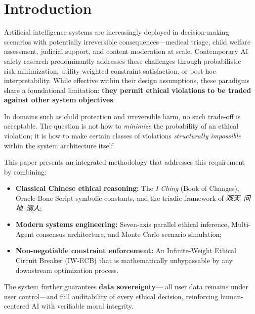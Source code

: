 \documentclass[conference]{IEEEtran}
\begin{document}
\section{Introduction}

Artificial intelligence systems are increasingly deployed in
decision-making scenarios with potentially irreversible
consequences---medical triage, child welfare assessment, judicial
support, and content moderation at scale. Contemporary AI safety
research predominantly addresses these challenges through
probabilistic risk minimization, utility-weighted constraint
satisfaction, or post-hoc interpretability. While effective
within their design assumptions, these paradigms share a
foundational limitation: \textbf{they permit ethical violations
to be traded against other system objectives}.

In domains such as child protection and irreversible harm, no
such trade-off is acceptable. The question is not how to
\textit{minimize} the probability of an ethical violation; it is
how to make certain classes of violations \textit{structurally
impossible} within the system architecture itself.

This paper presents an integrated methodology that addresses
this requirement by combining:

\begin{itemize}
  \item \textbf{Classical Chinese ethical reasoning:} The
  \textit{I Ching} (Book of Changes), Oracle Bone Script
  symbolic constants, and the triadic framework of
  \textit{观天}--\textit{问地}--\textit{演人};

  \item \textbf{Modern systems engineering:} Seven-axis
  parallel ethical inference, Multi-Agent consensus
  architecture, and Monte Carlo scenario simulation;

  \item \textbf{Non-negotiable constraint enforcement:}
  An Infinite-Weight Ethical Circuit Breaker (IW-ECB)
  that is mathematically unbypassable by any downstream
  optimization process.
\end{itemize}

The system further guarantees \textbf{data sovereignty}---
all user data remains under user control---and full
auditability of every ethical decision, reinforcing
human-centered AI with verifiable moral integrity.
\end{document}
